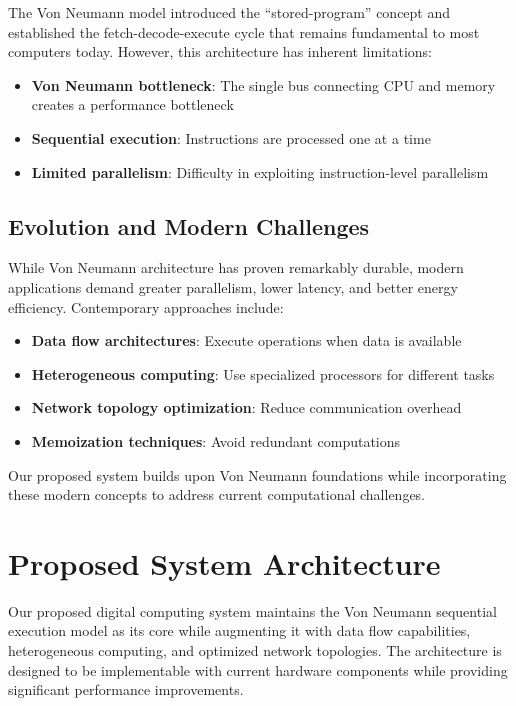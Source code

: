 \documentclass[11pt,a4paper]{article}
\begin{document}
The Von Neumann model introduced the ``stored-program'' concept and established the fetch-decode-execute cycle that remains fundamental to most computers today. However, this architecture has inherent limitations:

\begin{itemize}
\item \textbf{Von Neumann bottleneck}: The single bus connecting CPU and memory creates a performance bottleneck
\item \textbf{Sequential execution}: Instructions are processed one at a time
\item \textbf{Limited parallelism}: Difficulty in exploiting instruction-level parallelism
\end{itemize}

\subsection{Evolution and Modern Challenges}

While Von Neumann architecture has proven remarkably durable, modern applications demand greater parallelism, lower latency, and better energy efficiency. Contemporary approaches include:

\begin{itemize}
\item \textbf{Data flow architectures}: Execute operations when data is available~\citep{dennis1980data}
\item \textbf{Heterogeneous computing}: Use specialized processors for different tasks~\citep{asanovic2009view}
\item \textbf{Network topology optimization}: Reduce communication overhead
\item \textbf{Memoization techniques}: Avoid redundant computations
\end{itemize}

Our proposed system builds upon Von Neumann foundations while incorporating these modern concepts to address current computational challenges.

\section{Proposed System Architecture}
\label{sec:architecture}

Our proposed digital computing system maintains the Von Neumann sequential execution model as its core while augmenting it with data flow capabilities, heterogeneous computing, and optimized network topologies. The architecture is designed to be implementable with current hardware components while providing significant performance improvements.
\end{document}

